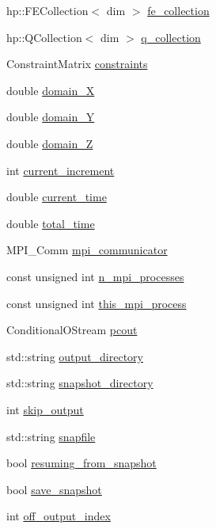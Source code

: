 \begin{DoxyCompactItemize}
\item 
hp\-::\-F\-E\-Collection$<$ dim $>$ \hyperlink{classinit_bound_val_probs_a02ae472de2833f8763bfe10520be87db}{fe\-\_\-collection}
\item 
hp\-::\-Q\-Collection$<$ dim $>$ \hyperlink{classinit_bound_val_probs_a748ffdb78a6294cd525fe5979bb30649}{q\-\_\-collection}
\item 
Constraint\-Matrix \hyperlink{classinit_bound_val_probs_aa08dcec4445eed1687b99cdb7b24b785}{constraints}
\item 
double \hyperlink{classinit_bound_val_probs_a9db8ce20b0de349987441b8d6830c97a}{domain\-\_\-\-X}
\item 
double \hyperlink{classinit_bound_val_probs_ae7a91557a809cfab5c3dee32ae1de8cb}{domain\-\_\-\-Y}
\item 
double \hyperlink{classinit_bound_val_probs_a199da42cf8a8e51eaeb5cacfdef1c37e}{domain\-\_\-\-Z}
\item 
int \hyperlink{classinit_bound_val_probs_a9a75da991ed1d29646660b1d16a0418f}{current\-\_\-increment}
\item 
double \hyperlink{classinit_bound_val_probs_a557717b333342f1e34a905d6162ce493}{current\-\_\-time}
\item 
double \hyperlink{classinit_bound_val_probs_abc276e47b85df9dd59f248e663b3b971}{total\-\_\-time}
\item 
M\-P\-I\-\_\-\-Comm \hyperlink{classinit_bound_val_probs_a03728ed636ca889ae407c84d181bc611}{mpi\-\_\-communicator}
\item 
const unsigned int \hyperlink{classinit_bound_val_probs_a7320777b83fedaf7a54cdb2fb0ef02e4}{n\-\_\-mpi\-\_\-processes}
\item 
const unsigned int \hyperlink{classinit_bound_val_probs_a6c34addfd3b89faf0a7b4e3fe1236fb0}{this\-\_\-mpi\-\_\-process}
\item 
Conditional\-O\-Stream \hyperlink{classinit_bound_val_probs_a914f651bc9ca2e223b243695dd37ba53}{pcout}
\item 
std\-::string \hyperlink{classinit_bound_val_probs_a95f0e6f488a1faae487cab4198842ebe}{output\-\_\-directory}
\item 
std\-::string \hyperlink{classinit_bound_val_probs_af7ed49a5ea9a6407acb26c5a729d4bd0}{snapshot\-\_\-directory}
\item 
int \hyperlink{classinit_bound_val_probs_a5413329bd1d73152f051cc8d11134f60}{skip\-\_\-output}
\item 
std\-::string \hyperlink{classinit_bound_val_probs_a3ce0cf43eef10e4757e8a225e9b98e96}{snapfile}
\item 
bool \hyperlink{classinit_bound_val_probs_a34ea26077a33f792a9468a4d0ac2feaf}{resuming\-\_\-from\-\_\-snapshot}
\item 
bool \hyperlink{classinit_bound_val_probs_ade455df689de2bc3fb79e1f468fd5404}{save\-\_\-snapshot}
\item 
int \hyperlink{classinit_bound_val_probs_a5b4ed019aaae8f2992f9418a93cd1dbb}{off\-\_\-output\-\_\-index}
\end{DoxyCompactItemize}


